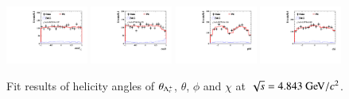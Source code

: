 \begin{figure}[H]\centering
    \includegraphics[width=0.24\textwidth]{figure/polarimetery/angular_plots/pkpi_4840_cos_theta0.pdf}
    \includegraphics[width=0.24\textwidth]{figure/polarimetery/angular_plots/pkpi_4840_cos_theta1.pdf}
    \includegraphics[width=0.24\textwidth]{figure/polarimetery/angular_plots/pkpi_4840_phi1.pdf}
    \includegraphics[width=0.24\textwidth]{figure/polarimetery/angular_plots/pkpi_4840_phi2.pdf}
    \caption{Fit results of helicity angles of $\theta_{\Lambda_{c}^{+}}$, $\theta$, $\phi$ and $\chi$ at $\sqrt{s} = 4.843\gev/c^2$.}
\label{fig:fit_angular_s10}
\end{figure}


